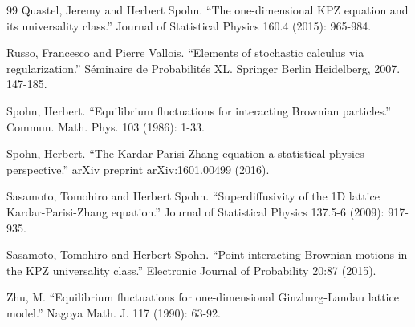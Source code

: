 \documentclass[11pt, a4paper]{article}
\newcommand{\1}{\mathbf{1}}
\begin{document}
\begin{thebibliography}{99}
    Quastel, Jeremy and Herbert Spohn. ``The one-dimensional KPZ equation and its universality class.'' Journal of Statistical Physics 160.4 (2015): 965-984.

    Russo, Francesco and Pierre Vallois. ``Elements of stochastic calculus via regularization.'' S\'eminaire de Probabilit\'es XL. Springer Berlin Heidelberg, 2007. 147-185.
    
    Spohn, Herbert. ``Equilibrium fluctuations for interacting Brownian particles.'' Commun. Math. Phys. 103 (1986): 1-33.

    Spohn, Herbert. ``The Kardar-Parisi-Zhang equation-a statistical physics perspective.'' arXiv preprint arXiv:1601.00499 (2016).

    Sasamoto, Tomohiro and Herbert Spohn. ``Superdiffusivity of the 1D lattice Kardar-Parisi-Zhang equation.'' Journal of Statistical Physics 137.5-6 (2009): 917-935.
    
    Sasamoto, Tomohiro and Herbert Spohn. ``Point-interacting Brownian motions in the KPZ universality class.'' Electronic Journal of Probability 20:87 (2015).
    
    Zhu, M. ``Equilibrium fluctuations for one-dimensional Ginzburg-Landau lattice
model.'' Nagoya Math. J. 117 (1990): 63-92.
    
\end{thebibliography}
\end{document}
